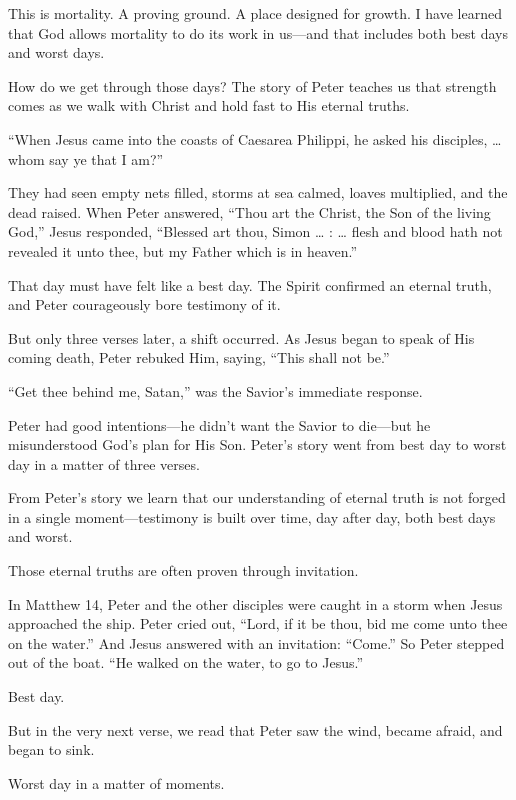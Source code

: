 \documentclass[letterpaper, 11pt]{report}
\newcommand{\intalkheader}[1]{
    \vspace{0.75em}
    \noindent{\normalsize\bfseries #1}
    \par\nopagebreak %
    \vspace{0.25em}
    \nopagebreak     %
}
\begin{document}
This is mortality. A proving ground. A place designed for growth. I have learned that God allows mortality to do its work in us—and that includes both best days and worst days.

How do we get through those days? The story of Peter teaches us that strength comes as we walk with Christ and hold fast to His eternal truths.

\intalkheader{Eternal Truths}

“When Jesus came into the coasts of Caesarea Philippi, he asked his disciples, … whom say ye that I am?”

They had seen empty nets filled, storms at sea calmed, loaves multiplied, and the dead raised. When Peter answered, “Thou art the Christ, the Son of the living God,” Jesus responded, “Blessed art thou, Simon … : … flesh and blood hath not revealed it unto thee, but my Father which is in heaven.”

That day must have felt like a best day. The Spirit confirmed an eternal truth, and Peter courageously bore testimony of it.

But only three verses later, a shift occurred. As Jesus began to speak of His coming death, Peter rebuked Him, saying, “This shall not be.”

“Get thee behind me, Satan,” was the Savior’s immediate response.

Peter had good intentions—he didn’t want the Savior to die—but he misunderstood God’s plan for His Son. Peter’s story went from best day to worst day in a matter of three verses.

From Peter’s story we learn that our understanding of eternal truth is not forged in a single moment—testimony is built over time, day after day, both best days and worst.

Those eternal truths are often proven through invitation.

\intalkheader{Invitations}

In Matthew 14, Peter and the other disciples were caught in a storm when Jesus approached the ship. Peter cried out, “Lord, if it be thou, bid me come unto thee on the water.” And Jesus answered with an invitation: “Come.” So Peter stepped out of the boat. “He walked on the water, to go to Jesus.”

Best day.

But in the very next verse, we read that Peter saw the wind, became afraid, and began to sink.

Worst day in a matter of moments.
\end{document}
